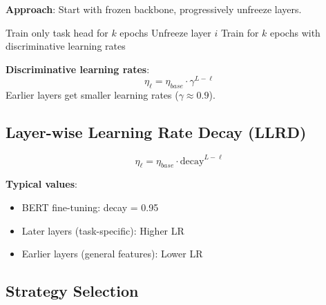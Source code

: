 \textbf{Approach}: Start with frozen backbone, progressively unfreeze layers.

\begin{algorithm}[H]
\caption{Gradual Unfreezing (ULMFiT)}
\begin{algorithmic}[1]
\STATE Train only task head for $k$ epochs
    \STATE Unfreeze layer $i$
    \STATE Train for $k$ epochs with discriminative learning rates
\ENDFOR
\end{algorithmic}
\end{algorithm}

\textbf{Discriminative learning rates}:
\begin{equation}
\eta_\ell = \eta_{base} \cdot \gamma^{L-\ell}
\end{equation}
Earlier layers get smaller learning rates ($\gamma \approx 0.9$).

\subsection{Layer-wise Learning Rate Decay (LLRD)}

\begin{equation}
\eta_\ell = \eta_{base} \cdot \text{decay}^{L - \ell}
\end{equation}

\textbf{Typical values}:
\begin{itemize}
    \item BERT fine-tuning: decay = 0.95
    \item Later layers (task-specific): Higher LR
    \item Earlier layers (general features): Lower LR
\end{itemize}

\subsection{Strategy Selection}

